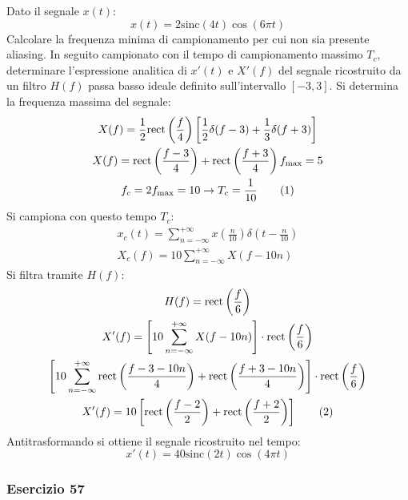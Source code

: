 \documentclass{article}
\newcommand{\rect}{\mathrm{rect}}
\newcommand{\sinc}{\mathrm{sinc}}
\newcommand{\tageq}{\tag{\stepcounter{equation}\theequation}}
\begin{document}
Dato il segnale $x(t)$:
\begin{equation*}
    x(t)=2\sinc(4t)\cos(6\pi t)
\end{equation*}
Calcolare la frequenza minima di campionamento per cui non sia presente aliasing. In seguito campionato con il tempo di campionamento massimo $T_c$, determinare 
l'espressione analitica di $x'(t)$ e $X'(f)$ del segnale ricostruito da un filtro $H(f)$ passa basso ideale definito sull'intervallo $[-3,3]$. 
Si determina la frequenza massima del segnale:
\begin{gather*}
    X(f)=\displaystyle\frac{1}{2}\rect\left(\frac{f}{4}\right)\left[\frac{1}{2}\delta(f-3)+\frac{1}{3}\delta(f+3)\right]\\
    X(f)=\rect\left(\displaystyle\frac{f-3}{4}\right)+\rect\left(\frac{f+3}{4}\right)
    f_{\max}=5\\
    f_c=2f_{\max}=10\to T_c=\displaystyle\frac{1}{10}\tageq
\end{gather*}
Si campiona con questo tempo $T_c$:
\begin{gather*}
    x_c(t)=\displaystyle\sum_{n=-\infty}^{+\infty}x\left(\frac{n}{10}\right)\delta\left(t-\frac{n}{10}\right)\\
    X_c(f)=10\displaystyle\sum_{n=-\infty}^{+\infty}X(f-10n)
\end{gather*}
Si filtra tramite $H(f)$:
\begin{gather*}
    H(f)=\displaystyle\rect\left(\frac{f}{6}\right)\\
    X'(f)=\left[10\displaystyle\sum_{n=-\infty}^{+\infty}X(f-10n)\right]\cdot\rect\left(\frac{f}{6}\right)\\
    \left[10\displaystyle\sum_{n=-\infty}^{+\infty}\rect\left(\displaystyle\frac{f-3-10n}{4}\right)+\rect\left(\frac{f+3-10n}{4}\right)\right]\cdot\rect\left(\frac{f}{6}\right)\\
    X'(f)=10\left[\displaystyle\rect\left(\frac{f-2}{2}\right)+\rect\left(\frac{f+2}{2}\right)\right]\tageq
\end{gather*}
Antitrasformando si ottiene il segnale ricostruito nel tempo:
\begin{equation}
    x'(t)=40\sinc(2t)\cos(4\pi t)
\end{equation}

\subsubsection*{Esercizio 57}
\end{document}
